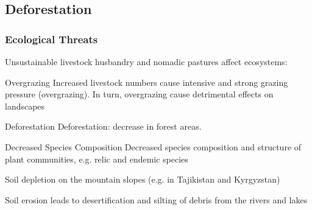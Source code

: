 \documentclass[pdflatex,compress,8pt,
	xcolor={dvipsnames,dvipsnames,svgnames,x11names,table},
	hyperref={colorlinks = true,
	breaklinks = true, 
	urlcolor = NavyBlue, 
	breaklinks = true}]{beamer}
\begin{document}
\subsection{Deforestation}
\begin{frame}\frametitle{Ecological Threats}
Unsustainable livestock husbandry and nomadic pastures affect ecosystems:

\begin{alertblock}{Overgrazing}
Increased livestock numbers cause intensive and strong grazing pressure (overgrazing). In turn, overgrazing cause detrimental effects on landscapes
\end{alertblock}

\begin{block}{Deforestation}
Deforestation: decrease in forest areas.
\end{block}

\begin{block}{Decreased Species Composition}
Decreased species composition and structure of plant communities, e.g. relic and endemic species
\end{block}

\begin{examples}{Soil depletion}
on the mountain slopes (e.g. in Tajikistan and Kyrgyzstan)
\end{examples}

\begin{examples}{Soil erosion}
leads to desertification and silting of debris from the rivers and lakes
\end{examples}

\end{frame}
\end{document}
